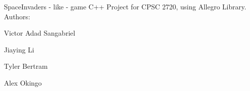 Space\+Invaders -\/ like -\/ game C++ Project for C\+P\+SC 2720, using Allegro Library. Authors\+:
\begin{DoxyItemize}
\item Victor Adad Sangabriel
\item Jiaying Li
\item Tyler Bertram
\item Alex Okingo 
\end{DoxyItemize}